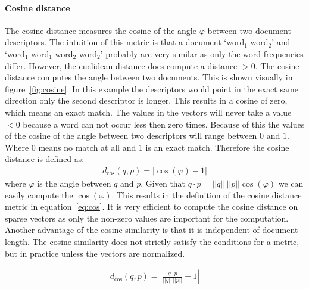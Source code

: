 \paragraph{Cosine distance} The cosine distance measures the cosine of the
angle $\varphi$ between two document descriptors. The intuition of this metric
is that a document `word$_1$ word$_2$' and `word$_1$ word$_1$ word$_2$
word$_2$' probably are very similar as only the word frequencies differ.
However, the euclidean distance does compute a distance $> 0$. The cosine
distance computes the angle between two documents. This is shown visually in
figure~\ref{fig:cosine}. In this example the descriptors would point in the
exact same direction only the second descriptor is longer.  This results in a
cosine of zero, which means an exact match. The values in the vectors will
never take a value $< 0$ because a word can not occur less then zero times.
Because of this the values of the cosine of the angle between two descriptors
will range between $0$ and $1$. Where 0 means no match at all and 1 is an exact
match. Therefore the cosine distance is defined as:
\begin{align*}
  d_\textrm{cos}(q,p) = |\cos(\varphi) - 1|
\end{align*}
where $\varphi$ is the angle between $q$ and $p$. Given that $q \cdot p = ||q||
\,||p|| \cos(\varphi)$ we can easily compute the $\cos(\varphi)$. This results
in the definition of the cosine distance metric in equation~\ref{eq:cos}. It is
very efficient to compute the cosine distance on sparse vectors as only the
non-zero values are important for the computation. Another advantage of the
cosine similarity is that it is independent of document length. The cosine
similarity does not strictly satisfy the conditions for a metric, but in 
practice unless the vectors are normalized.

\begin{align}
  d_\textrm{cos}(q,p) = \left| \frac{q \cdot p}{||q||\,||p||} - 1\right| \label{eq:cos}
\end{align}

